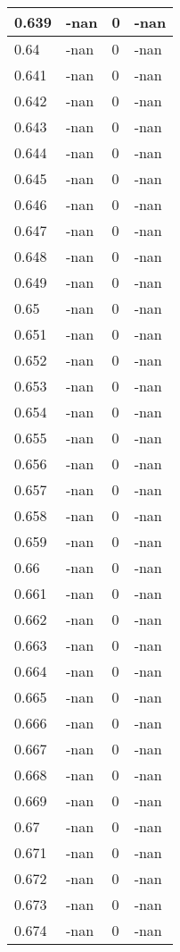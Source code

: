 \documentclass[a4paper,14pt]{extarticle}
\begin{document}
\begin{longtable}{||m{3cm}||m{3cm}|m{3cm}||m{3cm}||}
\hline
0.639 & -nan & 0 & -nan\\
\hline
0.64 & -nan & 0 & -nan\\
\hline
0.641 & -nan & 0 & -nan\\
\hline
0.642 & -nan & 0 & -nan\\
\hline
0.643 & -nan & 0 & -nan\\
\hline
0.644 & -nan & 0 & -nan\\
\hline
0.645 & -nan & 0 & -nan\\
\hline
0.646 & -nan & 0 & -nan\\
\hline
0.647 & -nan & 0 & -nan\\
\hline
0.648 & -nan & 0 & -nan\\
\hline
0.649 & -nan & 0 & -nan\\
\hline
0.65 & -nan & 0 & -nan\\
\hline
0.651 & -nan & 0 & -nan\\
\hline
0.652 & -nan & 0 & -nan\\
\hline
0.653 & -nan & 0 & -nan\\
\hline
0.654 & -nan & 0 & -nan\\
\hline
0.655 & -nan & 0 & -nan\\
\hline
0.656 & -nan & 0 & -nan\\
\hline
0.657 & -nan & 0 & -nan\\
\hline
0.658 & -nan & 0 & -nan\\
\hline
0.659 & -nan & 0 & -nan\\
\hline
0.66 & -nan & 0 & -nan\\
\hline
0.661 & -nan & 0 & -nan\\
\hline
0.662 & -nan & 0 & -nan\\
\hline
0.663 & -nan & 0 & -nan\\
\hline
0.664 & -nan & 0 & -nan\\
\hline
0.665 & -nan & 0 & -nan\\
\hline
0.666 & -nan & 0 & -nan\\
\hline
0.667 & -nan & 0 & -nan\\
\hline
0.668 & -nan & 0 & -nan\\
\hline
0.669 & -nan & 0 & -nan\\
\hline
0.67 & -nan & 0 & -nan\\
\hline
0.671 & -nan & 0 & -nan\\
\hline
0.672 & -nan & 0 & -nan\\
\hline
0.673 & -nan & 0 & -nan\\
\hline
0.674 & -nan & 0 & -nan\\

\end{longtable}
\end{document}
